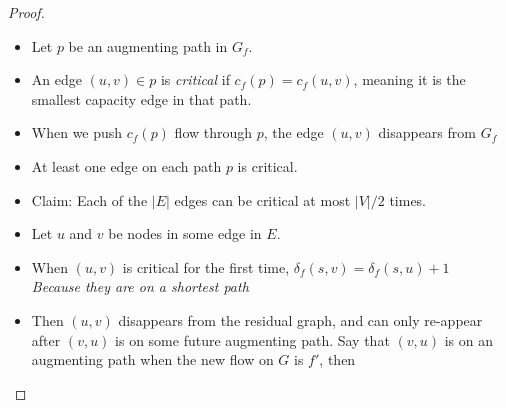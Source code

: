 \documentclass[11  pt]{article}
\begin{document}
\begin{proof}
	
	
	\begin{itemize}
		\item Let $p$ be an augmenting path in $G_f$.\\
		
		\item An edge $(u,v) \in p$ is \emph{critical} if $c_f(p) = c_f(u,v)$, meaning it is the smallest capacity edge in that path. \\
		
		\item When we push $c_f(p)$ flow through $p$, the edge $(u,v)$ disappears from $G_f$
		
		\vs{2cm}
		
		
		\item At least one edge on each path $p$ is critical.
		
		
		\item Claim: Each of the $|E|$ edges can be critical at most $|V|/2$ times.
		
	\end{itemize}
	\newpage
	\begin{itemize}
		
		\textbf{Proving the claim}: (u,v) becomes critical at most $|V|/2$ times.
		
		\item Let $u$ and $v$ be nodes in some edge in $E$. \\
		\item When $(u,v)$ is critical for the first time, $\delta_f(s,v) = \delta_f(s,u) + 1$ \\
		
		\textit{Because they are on a shortest path} \\
		
		\item Then $(u,v)$ disappears from the residual graph, and can only re-appear after $(v,u)$ is on some future augmenting path. Say that $(v,u)$ is on an augmenting path when the new flow on $G$ is $f'$, then 
		

\end{itemize}
\end{proof}
\end{document}
